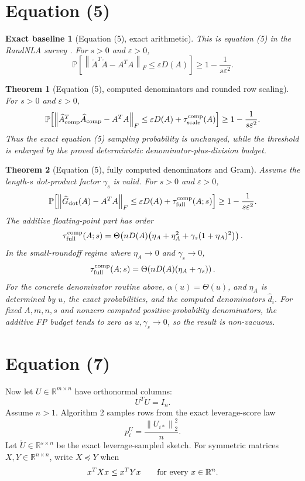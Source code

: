 \documentclass[11pt]{article}
\newcommand{\R}{\mathbb{R}}
\newcommand{\Prob}{\mathbb{P}}
\newcommand{\Frob}[1]{\left\lVert #1\right\rVert_F}
\newcommand{\Norm}[1]{\left\lVert #1\right\rVert_2}
\newcommand{\Atil}{\widetilde A}
\newcommand{\Util}{\widetilde U}
\newcommand{\Ahat}{\widehat A}
\newcommand{\Ghat}{\widehat G}
\newcommand{\I}{I}
\newcommand{\eps}{\varepsilon}
\newtheorem{theorem}{Theorem}
\newtheorem*{baseline}{Exact baseline}
\theoremstyle{remark}
\begin{document}
\section*{Equation (5)}

\begin{baseline}[Equation (5), exact arithmetic]
This is equation (5) in the RandNLA survey
\cite{DrineasMahoney2016RandNLA}.
For \(s>0\) and \(\eps>0\),
\[
  \Prob\!\left[
    \Frob{\Atil^T\Atil-A^TA}
    \le \eps D(A)
  \right]
  \ge
  1-\frac{1}{s\eps^2}.
\]
\end{baseline}

\begin{theorem}[Equation (5), computed denominators and rounded row scaling]
For \(s>0\) and \(\eps>0\),
\[
  \Prob\!\left[
    \Frob{\Ahat_{\rm comp}^T\Ahat_{\rm comp}-A^TA}
    \le
    \eps D(A)+\tau_{\rm scale}^{\rm comp}(A)
  \right]
  \ge
  1-\frac{1}{s\eps^2}.
\]
Thus the exact equation (5) sampling probability is unchanged, while the
threshold is enlarged by the proved deterministic denominator-plus-division
budget.
\end{theorem}

\begin{theorem}[Equation (5), fully computed denominators and Gram]
Assume the length-\(s\) dot-product factor \(\gamma_s\) is valid.  For \(s>0\)
and \(\eps>0\),
\[
  \Prob\!\left[
    \Frob{\Ghat_{\rm dot}(A)-A^TA}
    \le
    \eps D(A)+\tau_{\rm full}^{\rm comp}(A;s)
  \right]
  \ge
  1-\frac{1}{s\eps^2}.
\]
The additive floating-point part has order
\[
  \tau_{\rm full}^{\rm comp}(A;s)
  =
  \Theta\!\left(
    nD(A)\bigl(\eta_A+\eta_A^2+\gamma_s(1+\eta_A)^2\bigr)
  \right).
\]
In the small-roundoff regime where \(\eta_A\to0\) and \(\gamma_s\to0\),
\[
  \tau_{\rm full}^{\rm comp}(A;s)
  =
  \Theta\!\left(nD(A)(\eta_A+\gamma_s)\right).
\]
For the concrete denominator routine above, \(\alpha(u)=\Theta(u)\), and
\(\eta_A\) is determined by \(u\), the exact probabilities, and the computed
denominators \(\widehat d_i\).  For fixed \(A,m,n,s\) and nonzero computed
positive-probability denominators, the additive FP budget tends to zero as
\(u,\gamma_s\to0\), so the result is non-vacuous.
\end{theorem}

\section*{Equation (7)}

Now let \(U\in\R^{m\times n}\) have orthonormal columns:
\[
  U^TU=\I_n.
\]
Assume \(n>1\).  Algorithm 2 samples rows from the exact leverage-score law
\[
  p_i^U=\frac{\Norm{U_{i*}}^2}{n}.
\]
Let \(\Util\in\R^{s\times n}\) be the exact leverage-sampled sketch.  For
symmetric matrices \(X,Y\in\R^{n\times n}\), write \(X\preceq Y\) when
\[
  x^T X x\le x^T Y x
  \qquad\hbox{for every }x\in\R^n.
\]
\end{document}
